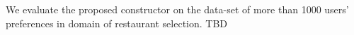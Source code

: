 \label{sec_eval}
We evaluate the proposed constructor on the data-set of more than 1000 users' preferences in domain of restaurant selection.
TBD